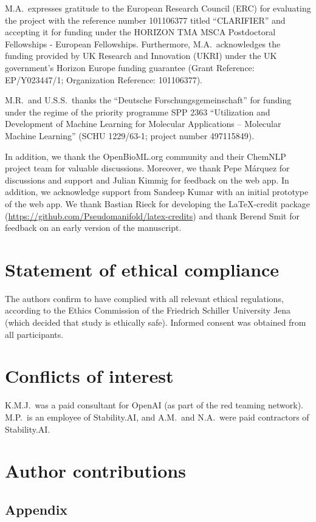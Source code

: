 \documentclass[11pt, oneside]{article}
\begin{document}
\begin{refsection}
M.A.\ expresses gratitude to the European Research Council (ERC) for evaluating the project with the reference number 101106377 titled \enquote{CLARIFIER} and accepting it for funding under the HORIZON TMA MSCA Postdoctoral Fellowships - European Fellowships.
Furthermore, M.A.\ acknowledges the funding provided by UK Research and Innovation (UKRI) under the UK government’s Horizon Europe funding guarantee (Grant Reference: EP/Y023447/1; Organization Reference: 101106377).

M.R.\ and U.S.S.\ thanks the \enquote{Deutsche Forschungsgemeinschaft} for funding under the regime of the priority programme SPP 2363 \enquote{Utilization and Development of Machine Learning for Molecular Applications – Molecular Machine Learning} (SCHU 1229/63-1; project number 497115849).

In addition, we thank the OpenBioML.org community and their ChemNLP project team for valuable discussions.
Moreover, we thank Pepe Márquez for discussions and support and Julian Kimmig for feedback on the web app.
In addition, we acknowledge support from Sandeep Kumar with an initial prototype of the web app.
We thank Bastian Rieck for developing the \LaTeX-credit package (\url{https://github.com/Pseudomanifold/latex-credits}) and thank Berend Smit for feedback on an early version of the manuscript.


\section*{Statement of ethical compliance}
The authors confirm to have complied with all relevant ethical regulations, according to the Ethics Commission of the Friedrich Schiller University Jena (which decided that study is ethically safe). Informed consent was obtained from all participants.


\section*{Conflicts of interest}
K.M.J.\ was a paid consultant for OpenAI (as part of the red teaming network). M.P.\ is an employee of Stability.AI, and A.M.\ and N.A.\ were paid contractors of Stability.AI.

\section*{Author contributions}

\resizebox{\textwidth}{!}{%
\scriptsize
\insertcredits
}
\normalsize
\printbibliography
\end{refsection}

\clearpage
\begin{refsection}
\renewcommand{\thefigure}{A\arabic{figure}}
\setcounter{figure}{0}

\renewcommand{\thetable}{A\arabic{table}}
\setcounter{table}{0}

\appendix
\section{Appendix}

\clearpage
\printbibliography[heading=subbibintoc]
\end{refsection}
\end{document}
